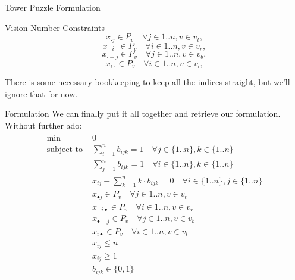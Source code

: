 \documentclass[12pt]{article}
\begin{document}
\begin{section}{Tower Puzzle Formulation}
\begin{subsection}{Vision Number Constraints}
\[x_{\cdot j}\in P_v \quad \forall j\in{1..n},v\in v_t,\]
\[x_{-i\cdot}\in P_v \quad \forall i\in{1..n},v\in v_r,\]
\[x_{\cdot -j}\in P_v \quad \forall j\in{1..n},v\in v_b,\]
\[x_{i\cdot}\in P_v \quad \forall i\in{1..n},v\in v_l,\]

There is some necessary bookkeeping to keep all the indices straight, but we'll ignore that for now.
\end{subsection}
\begin{subsection}{Formulation}
We can finally put it all together and retrieve our formulation. Without further ado:
\begin{align*}
    \begin{split}
        \mbox{min }&0 \\
        \mbox{subject to }&\sum_{i=1}^{n}b_{ijk} = 1 \quad \forall j\in\{1..n\},k\in\{1..n\} \\
        &\sum_{j=1}^{n}b_{ijk} = 1 \quad \forall i\in\{1..n\},k\in\{1..n\} \\
        &x_{ij} - \sum_{k=1}^nk\cdot b_{ijk} = 0 \quad \forall i\in\{1..n\},j\in\{1..n\} \\
        &x_{\bullet j}\in P_v \quad \forall j\in{1..n},v\in v_t \\
        &x_{-i\bullet}\in P_v \quad \forall i\in{1..n},v\in v_r \\
        &x_{\bullet -j}\in P_v \quad \forall j\in{1..n},v\in v_b \\
        &x_{i\bullet}\in P_v \quad \forall i\in{1..n},v\in v_l \\
        &x_{ij}\leq n \\
        &x_{ij}\geq 1 \\
        &b_{ijk}\in \{0,1\} \\
    \end{split}
\end{align*}
\end{subsection}
\end{section}
\end{document}
